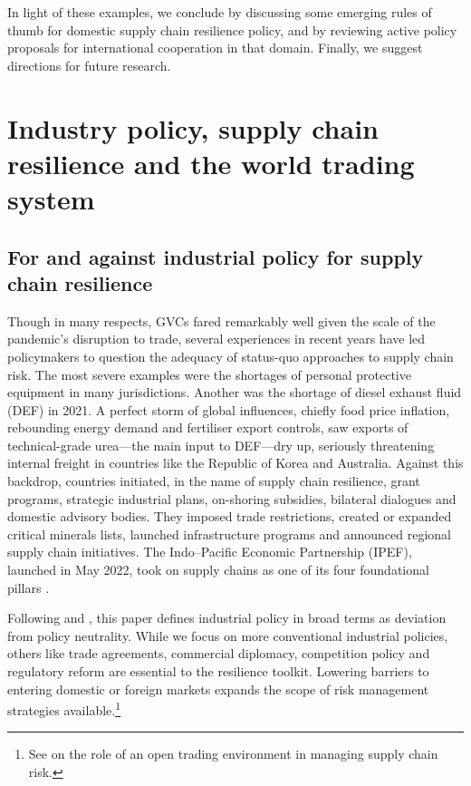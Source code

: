 \documentclass{article}
\begin{document}
In light of these examples, we conclude by discussing some emerging rules of thumb for domestic supply chain resilience policy, and by reviewing active policy proposals for international cooperation in that domain. Finally, we suggest directions for future research.

\section{Industry policy, supply chain resilience and the world trading system}

\subsection{For and against industrial policy for supply chain resilience}

Though in many respects, GVCs fared remarkably well given the scale of the pandemic's disruption to trade, several experiences in recent years have led policymakers to question the adequacy of status-quo approaches to supply chain risk. The most severe examples were the shortages of personal protective equipment in many jurisdictions. Another was the shortage of diesel exhaust fluid (DEF) in 2021. A perfect storm of global influences, chiefly food price inflation, rebounding energy demand and fertiliser export controls, saw exports of technical-grade urea---the main input to DEF---dry up, seriously threatening internal freight in countries like the Republic of Korea and Australia. Against this backdrop, countries initiated, in the name of supply chain resilience, grant programs, strategic industrial plans, on-shoring subsidies, bilateral dialogues and domestic advisory bodies. They imposed trade restrictions, created or expanded critical minerals lists, launched infrastructure programs and announced regional supply chain initiatives. The Indo--Pacific Economic Partnership (IPEF), launched in May 2022, took on supply chains as one of its four foundational pillars \parencite{hardwick_policy_2024}.

Following \textcite{harrison_trade_2010} and \textcite{bown_modern_2024}, this paper defines industrial policy in broad terms as deviation from policy neutrality. While we focus on more conventional industrial policies, others like trade agreements, commercial diplomacy, competition policy and regulatory reform are essential to the resilience toolkit. Lowering barriers to entering domestic or foreign markets expands the scope of risk management strategies available.\footnote{See \textcite[145--148]{productivity_commission_vulnerable_2021} on the role of an open trading environment in managing supply chain risk.}
\end{document}
